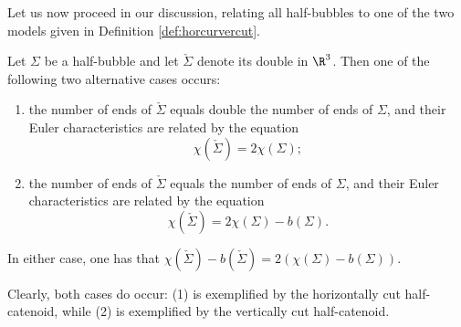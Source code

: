         	Let us now proceed in our discussion, relating all half-bubbles to one of the two models given in Definition \ref{def:horcurvercut}.
        	
        	\begin{lem}\label{lem:euler}
        		Let $\Sigma$ be a half-bubble and let $\check{\Sigma}$ denote its double in $\R^3$. Then one of the following two alternative cases occurs:
        		\begin{enumerate}
        			\item{the number of ends of $\check{\Sigma}$ equals double the number of ends of $\Sigma$, and their Euler characteristics are related by the equation
        				\[
        				\chi(\check{\Sigma})=2\chi(\Sigma);
        				\]	
        			}
        			\item{the number of ends of $\check{\Sigma}$ equals the number of ends of $\Sigma$,  and their Euler characteristics are related by the equation
        				\[
        				\chi(\check{\Sigma})=2\chi(\Sigma)-b(\Sigma).
        				\]
        			}	
        			\end{enumerate}
        			In either case, one has that $\chi(\check{\Sigma})-b(\check{\Sigma})=2(\chi(\Sigma)-b(\Sigma))$.
        	\end{lem}	
        	
        	Clearly, both cases do occur: (1) is exemplified by the horizontally cut half-catenoid, while (2) is exemplified by the vertically cut half-catenoid. 
        	
